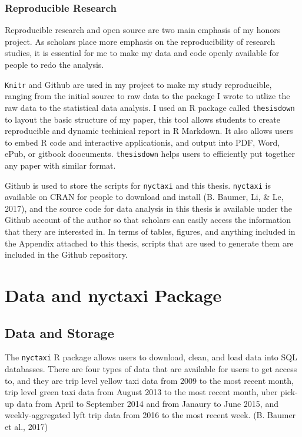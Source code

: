 \documentclass[12pt,twoside]{reedthesis}
\theoremstyle{definition}
\theoremstyle{definition}
\theoremstyle{definition}
\theoremstyle{remark}
\begin{document}
\subsection{Reproducible Research}\label{reproducible-research}

Reproducible research and open source are two main emphasis of my honors
project. As scholars place more emphasis on the reproducibility of
research studies, it is essential for me to make my data and code openly
available for people to redo the analysis.

\texttt{Knitr} and Github are used in my project to make my study
reproducible, ranging from the initial source to raw data to the package
I wrote to utlize the raw data to the statistical data analysis. I used
an R package called \texttt{thesisdown} to layout the basic structure of
my paper, this tool allows students to create reproducible and dynamic
techinical report in R Markdown. It also allows users to embed R code
and interactive applicationis, and output into PDF, Word, ePub, or
gitbook doocuments. \texttt{thesisdown} helps users to efficiently put
together any paper with similar format.

Github is used to store the scripts for \texttt{nyctaxi} and this
thesis. \texttt{nyctaxi} is available on CRAN for people to download and
install (B. Baumer, Li, \& Le, 2017), and the source code for data
analysis in this thesis is available under the Github account of the
author so that scholars can easily access the information that thery are
interested in. In terms of tables, figures, and anything included in the
Appendix attached to this thesis, scripts that are used to generate them
are included in the Github repository.

\chapter{Data and nyctaxi Package}\label{chapter2}

\section{Data and Storage}\label{data-and-storage}

The \texttt{nyctaxi} R package allows users to download, clean, and load
data into SQL databasses. There are four types of data that are
available for users to get access to, and they are trip level yellow
taxi data from 2009 to the most recent month, trip level green taxi data
from August 2013 to the most recent month, uber pick-up data from April
to September 2014 and from Janaury to June 2015, and weekly-aggregated
lyft trip data from 2016 to the most recent week. (B. Baumer et al.,
2017)
\end{document}
